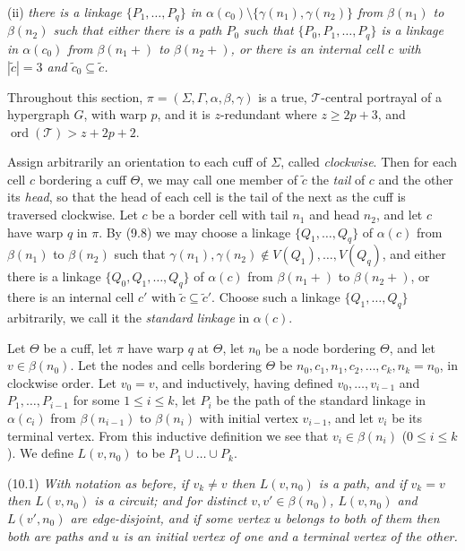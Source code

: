 \hspace*{12pt}(ii) \textit{there is a linkage $\{P_1, \dots, P_q\}$ in $\alpha(c_0) \setminus \{\gamma(n_1), \gamma(n_2)\}$ from $\beta(n_1)$ to $\beta(n_2)$ such that either there is a path $P_0$ such that $\{P_0, P_1, \dots, P_q\}$ is a linkage in $\alpha(c_0)$ from $\beta(n_1 +)$ to $\beta(n_2 +)$, or there is an internal cell $c$ with $|\tilde{c}| = 3$ and $\tilde{c}_0 \subseteq \tilde{c}$.}


Throughout this section, $\pi = (\Sigma, \Gamma, \alpha, \beta, \gamma)$ is a true, $\mathcal{T}$-central portrayal of a hypergraph $G$, with warp $p$, and it is $z$-redundant where $z \ge 2p + 3$, and $\operatorname{ord}(\mathcal{T}) > z + 2p + 2$.

Assign arbitrarily an orientation to each cuff of $\Sigma$, called \textit{clockwise}. Then for each cell $c$ bordering a cuff $\Theta$, we may call one member of $\tilde{c}$ the \textit{tail} of $c$ and the other its \textit{head}, so that the head of each cell is the tail of the next as the cuff is traversed clockwise. Let $c$ be a border cell with tail $n_1$ and head $n_2$, and let $c$ have warp $q$ in $\pi$. By (9.8) we may choose a linkage $\{Q_1, \dots, Q_q\}$ of $\alpha(c)$ from $\beta(n_1)$ to $\beta(n_2)$ such that $\gamma(n_1), \gamma(n_2) \notin V(Q_1), \dots, V(Q_q)$, and either there is a linkage $\{Q_0, Q_1, \dots, Q_q\}$ of $\alpha(c)$ from $\beta(n_1 +)$ to $\beta(n_2 +)$, or there is an internal cell $c'$ with $\tilde{c} \subseteq \tilde{c}'$. Choose such a linkage $\{Q_1, \dots, Q_q\}$ arbitrarily, we call it the \textit{standard linkage} in $\alpha(c)$.

Let $\Theta$ be a cuff, let $\pi$ have warp $q$ at $\Theta$, let $n_0$ be a node bordering $\Theta$, and let $v \in \beta(n_0)$. Let the nodes and cells bordering $\Theta$ be $n_0, c_1, n_1, c_2, \dots, c_k, n_k = n_0$, in clockwise order. Let $v_0 = v$, and inductively, having defined $v_0, \dots, v_{i-1}$ and $P_1, \dots, P_{i-1}$ for some $1 \le i \le k$, let $P_i$ be the path of the standard linkage in $\alpha(c_i)$ from $\beta(n_{i-1})$ to $\beta(n_i)$ with initial vertex $v_{i-1}$, and let $v_i$ be its terminal vertex. From this inductive definition we see that $v_i \in \beta(n_i)$ ($0 \le i \le k$). We define $L(v, n_0)$ to be $P_1 \cup \dots \cup P_k$.

\stmt
(10.1) \textit{With notation as before, if $v_k \ne v$ then $L(v, n_0)$ is a path, and if $v_k = v$ then $L(v, n_0)$ is a circuit; and for distinct $v, v' \in \beta(n_0)$, $L(v, n_0)$ and $L(v', n_0)$ are edge-disjoint, and if some vertex $u$ belongs to both of them then both are paths and $u$ is an initial vertex of one and a terminal vertex of the other.}

